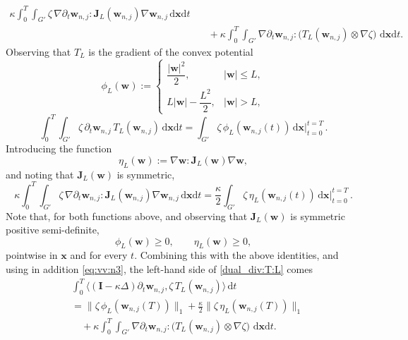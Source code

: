 \documentclass[12pt,reqno]{amsart}
\numberwithin{equation}{section}
\theoremstyle{definition}
\def\dx{\,\mathrm{d}\boldsymbol{x}}
\def\dt{\,\mathrm{d}t}
\def\dxt{\,\mathrm{d}\boldsymbol{x}\mathrm{d}t}
\def\w{\boldsymbol{w}}
\def\x{\boldsymbol{x}}
\def\bfI{\mathbf{I}}
\begin{document}
{{{\begin{equation*}
\begin{split}
  \kappa\int_{0}^{T}\!\!\!\!\int_{G'}\zeta\,\nabla\partial_t\w_{n,j}:\mathbf{J}_L(\w_{n,j})\nabla\w_{n,j}\dxt  \\
  &\quad +\kappa\int_{0}^{T}\!\!\!\!\int_{G'}\nabla\partial_t\w_{n,j}:\big(T_L(\w_{n,j})\otimes\nabla\zeta\big)\,\dxt.
\end{split}
\end{equation*}
Observing that $T_L$ is the gradient of the convex potential
\begin{equation*}
\phi_L(\w):=
\begin{cases}
\dfrac{|\w|^2}{2}, & |\w|\le L,\\[1ex]
L|\w|-\dfrac{L^2}{2}, & |\w|>L,
\end{cases}
\end{equation*}
\begin{equation*}
\int_{0}^{T}\!\!\!\!\int_{G'}\zeta\,\partial_t\w_{n,j}\,T_L(\w_{n,j})\dxt=
\int_{G'}\zeta\,\phi_L(\w_{n,j}(t))\dx\bigg|_{t=0}^{t=T}\,.
\end{equation*}
Introducing the function
\begin{equation*}
\eta_L(\w):=\nabla\w:\mathbf{J}_L(\w)\nabla\w,
\end{equation*}
and noting that $\mathbf{J}_L(\w)$ is symmetric,
\begin{equation*}
\kappa\int_{0}^{T}\!\!\!\!\int_{G'}\zeta\,\nabla\partial_t\w_{n,j}:\mathbf{J}_L(\w_{n,j})\nabla\w_{n,j}\dxt=
\frac{\kappa}{2}\int_{G'}\zeta\,\eta_L(\w_{n,j}(t))\dx\bigg|_{t=0}^{t=T}\,.
\end{equation*}
Note that, for both functions above, and observing that $\mathbf{J}_L(\w)$ is symmetric positive semi-definite,
\begin{equation*}
\phi_L(\w)\geq 0,\qquad \eta_L(\w)\geq 0,
\end{equation*}
pointwise in $\x$ and for every $t$. Combining this with the above identities, and using in addition \eqref{eq:vv:n3},
the left-hand side of \eqref{dual_div:T:L} comes
\begin{equation}\label{dual:n:j:lhs}
\begin{split}
& \int_{0}^{T}\big\langle(\bfI-\kappa\Delta)\partial_t\w_{n,j},\zeta\,T_L(\w_{n,j})\big\rangle\dt
\\&=
\|\zeta\,\phi_L(\w_{n,j}(T))\|_1 + \frac{\kappa}{2}\|\zeta\,\eta_L(\w_{n,j}(T))\|_1
\\
&\quad +\kappa\int_{0}^{T}\!\!\!\!\int_{G'}\nabla\partial_t\w_{n,j}:\big(T_L(\w_{n,j})\otimes\nabla\zeta\big)\,\dxt.
\end{split}
\end{equation}

}}}
\end{document}
